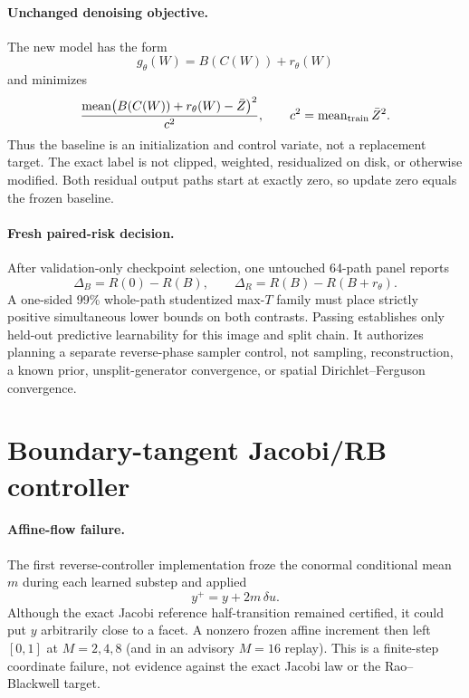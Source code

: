 \documentclass[11pt]{article}
\begin{document}
\paragraph{Unchanged denoising objective.}
The new model has the form
\[
  g_\theta(W)=B(C(W))+r_\theta(W)
\]
and minimizes
\[
  \frac{\operatorname{mean}
    \bigl(B(C(W))+r_\theta(W)-\bar Z\bigr)^2}{c^2},
  \qquad
  c^2=\operatorname{mean}_{\rm train}\bar Z^2.
\]
Thus the baseline is an initialization and control variate, not a replacement
target. The exact label is not clipped, weighted, residualized on disk, or
otherwise modified. Both residual output paths start at exactly zero, so
update zero equals the frozen baseline.

\paragraph{Fresh paired-risk decision.}
After validation-only checkpoint selection, one untouched 64-path panel
reports
\[
 \Delta_B=R(0)-R(B),\qquad
 \Delta_R=R(B)-R(B+r_\theta).
\]
A one-sided 99\% whole-path studentized max-$T$ family must place strictly
positive simultaneous lower bounds on both contrasts. Passing establishes
only held-out predictive learnability for this image and split chain. It
authorizes planning a separate reverse-phase sampler control, not sampling,
reconstruction, a known prior, unsplit-generator convergence, or spatial
Dirichlet--Ferguson convergence.

\section{Boundary-tangent Jacobi/RB controller}

\paragraph{Affine-flow failure.}
The first reverse-controller implementation froze the conormal conditional
mean $m$ during each learned substep and applied
\[
  y^+=y+2m\,\delta u.
\]
Although the exact Jacobi reference half-transition remained certified, it
could put $y$ arbitrarily close to a facet. A nonzero frozen affine increment
then left $[0,1]$ at $M=2,4,8$ (and in an advisory $M=16$ replay). This is a
finite-step coordinate failure, not evidence against the exact Jacobi law or
the Rao--Blackwell target.
\end{document}
